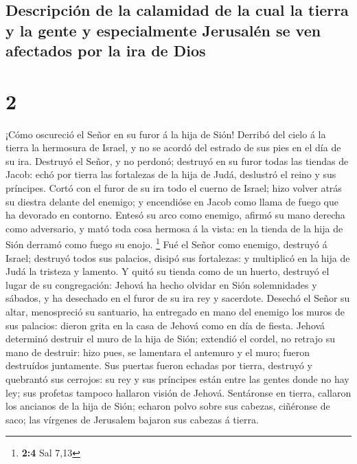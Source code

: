 \hypertarget{descripciuxf3n-de-la-calamidad-de-la-cual-la-tierra-y-la-gente-y-especialmente-jerusaluxe9n-se-ven-afectados-por-la-ira-de-dios}{%
\subsection{Descripción de la calamidad de la cual la tierra y la gente
y especialmente Jerusalén se ven afectados por la ira de
Dios}\label{descripciuxf3n-de-la-calamidad-de-la-cual-la-tierra-y-la-gente-y-especialmente-jerusaluxe9n-se-ven-afectados-por-la-ira-de-dios}}

\hypertarget{section-1}{%
\section{2}\label{section-1}}

 ¡Cómo oscureció el Señor en su furor á la hija de Sión!
Derribó del cielo á la tierra la hermosura de Israel, y no se acordó del
estrado de sus pies en el día de su ira.  Destruyó el
Señor, y no perdonó; destruyó en su furor todas las tiendas de Jacob:
echó por tierra las fortalezas de la hija de Judá, deslustró el reino y
sus príncipes.  Cortó con el furor de su ira todo el
cuerno de Israel; hizo volver atrás su diestra delante del enemigo; y
encendióse en Jacob como llama de fuego que ha devorado en contorno.
 Entesó su arco como enemigo, afirmó su mano derecha como
adversario, y mató toda cosa hermosa á la vista: en la tienda de la hija
de Sión derramó como fuego su enojo. \footnote{\textbf{2:4} Sal 7,13}
 Fué el Señor como enemigo, destruyó á Israel; destruyó
todos sus palacios, disipó sus fortalezas: y multiplicó en la hija de
Judá la tristeza y lamento.  Y quitó su tienda como de un
huerto, destruyó el lugar de su congregación: Jehová ha hecho olvidar en
Sión solemnidades y sábados, y ha desechado en el furor de su ira rey y
sacerdote.  Desechó el Señor su altar, menospreció su
santuario, ha entregado en mano del enemigo los muros de sus palacios:
dieron grita en la casa de Jehová como en día de fiesta. 
Jehová determinó destruir el muro de la hija de Sión; extendió el
cordel, no retrajo su mano de destruir: hizo pues, se lamentara el
antemuro y el muro; fueron destruídos juntamente.  Sus
puertas fueron echadas por tierra, destruyó y quebrantó sus cerrojos: su
rey y sus príncipes están entre las gentes donde no hay ley; sus
profetas tampoco hallaron visión de Jehová.  Sentáronse
en tierra, callaron los ancianos de la hija de Sión; echaron polvo sobre
sus cabezas, ciñéronse de saco; las vírgenes de Jerusalem bajaron sus
cabezas á tierra.

